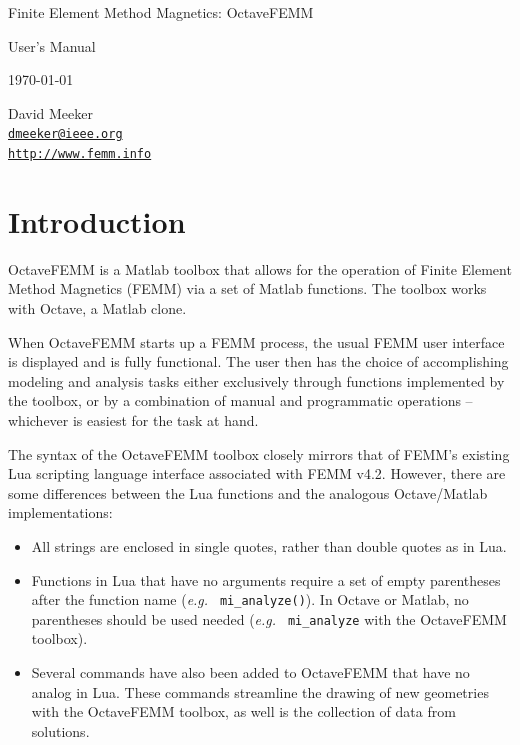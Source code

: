 \documentclass[12pt]{article}
\begin{document}
\thispagestyle{empty}

\vspace*{2.5in}

\vspace*{0.5in}
\begin{center}
{\LARGE Finite Element Method Magnetics: OctaveFEMM}


\vspace*{16pt} {\Large User's Manual}

\vspace*{16pt} \today

\vspace*{48pt} David Meeker \\
\href{mailto:dmeeker@ieee.org}{\tt dmeeker@ieee.org} \\
\href{http://www.femm.info}{\tt http://www.femm.info} \\
\end{center}

\newpage


\section{Introduction}

OctaveFEMM is a Matlab toolbox that allows for the operation of Finite
Element Method Magnetics (FEMM) via a set of Matlab functions.  The toolbox
works with Octave, a Matlab clone.

When OctaveFEMM starts up a FEMM process, the usual FEMM user interface
is displayed and is fully functional.  The user then has the choice of
accomplishing modeling and analysis tasks either exclusively through
functions implemented by the toolbox, or by a combination of manual and
programmatic operations -- whichever is easiest for the task at hand.

The syntax of the OctaveFEMM toolbox closely mirrors that of FEMM's existing
Lua scripting language interface associated with FEMM v4.2.  However, there
are some differences between the Lua functions and the analogous Octave/Matlab
implementations:
\begin{itemize}
\item All strings are enclosed in single quotes, rather than
double quotes as in Lua.
\item Functions in Lua that have no arguments require a set of
empty parentheses after the function name ({\em e.g.} {\tt
mi\_analyze()}).  In Octave or Matlab, no parentheses should be used needed ({\em e.g.} {\tt
mi\_analyze} with the OctaveFEMM toolbox).
\item Several commands have also been added to OctaveFEMM that have no
analog in Lua.  These commands streamline the drawing of new
geometries with the OctaveFEMM toolbox, as well is the collection
of data from solutions.
\end{itemize}
\end{document}
